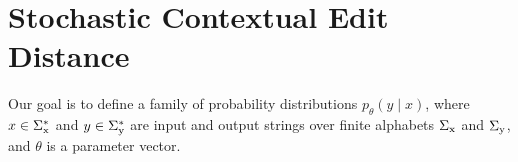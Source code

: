 \documentclass[11pt,letterpaper]{article}
\newcommand{\Sigmax}{\Sigma_{\text x}}
\newcommand{\Sigmay}{\Sigma_{\text y}}
\newcommand{\ptheta}{{p_\theta}}
\newcommand{\ryan}[1]{\todo[color=green!40,author=Ryan]{#1}}
\begin{document}




\section{Stochastic Contextual Edit Distance}\label{sec:csed}

Our goal is to define a family of probability distributions $\ptheta(y\mid x)$, where $x \in \Sigmax^*$ and $y \in \Sigmay^*$ are input and output strings over finite alphabets $\Sigmax$ and $\Sigmay$, and $\theta$ is a parameter vector.  
\end{document}
